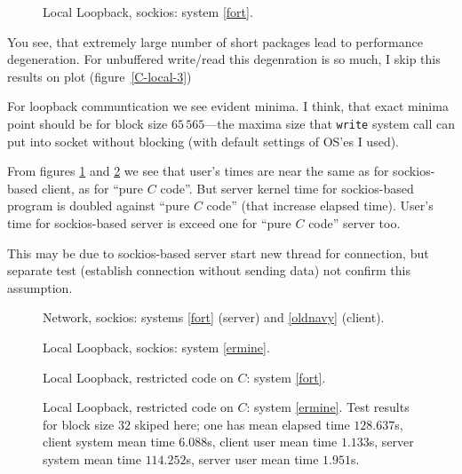 \documentclass[a4paper]{article}
\begin{document}
\begin{figure}
  \begin{center}
    
  \end{center}
  \caption{Local Loopback, sockios: system \ref{fort}.}
\end{figure}

You see, that extremely large number of short packages lead to
performance degeneration. For unbuffered write/read this degenration
is so much, I skip this results on plot (figure~\ref{C-local-3})

For loopback communtication we see evident minima. I think, that
exact minima point should be for block size $65\,565$---the maxima size
that \texttt{write} system call can put into socket without blocking
(with default settings of OS'es I used).

From figures \ref{local-1} and \ref{C-local-1} we see that user's times
are near the same as for sockios-based client, as for ``pure $C$ code''.
But server kernel time for sockios-based program is
doubled against ``pure $C$ code'' (that increase elapsed time).
User's time for sockios-based server is exceed one for ``pure $C$ code''
server too.

This may be due to sockios-based server start new thread for connection,
but separate test (establish connection without sending data) not confirm
this assumption.

\begin{figure}
  \begin{center}
    
  \end{center}
  \caption{Network, sockios:
           systems \ref{fort} (server) and \ref{oldnavy} (client).\label{local-1}}
\end{figure}

\begin{figure}
  \begin{center}
    
  \end{center}
  \caption{Local Loopback, sockios: system \ref{ermine}.}
\end{figure}

\begin{figure}
  \begin{center}
    
  \end{center}
  \caption{Local Loopback, restricted code on $C$: system \ref{fort}.\label{C-local-1}}
\end{figure}

\begin{figure}
  \begin{center}
    
  \end{center}
  \caption{Local Loopback, restricted code on $C$: system \ref{ermine}.
           Test results for block size $32$ skiped here; one has 
           mean elapsed time $128.637$s, client system mean 
           time $6.088$s, client user mean time $1.133$s, server system
           mean time $114.252$s, server user mean time $1.951$s.\label{local-C-ermine}}
\end{figure}
\end{document}
